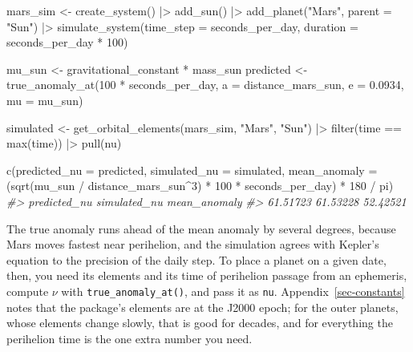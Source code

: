 \documentclass[
  10.5pt,
  letterpaper,
]{scrbook}
\newenvironment{Shaded}{\begin{snugshade}}{\end{snugshade}}
\newcommand{\AttributeTok}[1]{\textcolor[rgb]{0.00,0.00,0.00}{#1}}
\newcommand{\CommentTok}[1]{\textcolor[rgb]{0.00,0.00,0.00}{\textit{#1}}}
\newcommand{\DecValTok}[1]{\textcolor[rgb]{0.00,0.00,0.00}{#1}}
\newcommand{\FloatTok}[1]{\textcolor[rgb]{0.00,0.00,0.00}{#1}}
\newcommand{\FunctionTok}[1]{\textcolor[rgb]{0.00,0.00,0.00}{#1}}
\newcommand{\NormalTok}[1]{\textcolor[rgb]{0.00,0.00,0.00}{#1}}
\newcommand{\OtherTok}[1]{\textcolor[rgb]{0.00,0.00,0.00}{#1}}
\newcommand{\SpecialCharTok}[1]{\textcolor[rgb]{0.00,0.00,0.00}{#1}}
\newcommand{\StringTok}[1]{\textcolor[rgb]{0.00,0.00,0.00}{#1}}
\theoremstyle{definition}
\theoremstyle{plain}
\theoremstyle{remark}
\begin{document}
\begin{Shaded}
\begin{Highlighting}[]
\NormalTok{mars\_sim }\OtherTok{\textless{}{-}} \FunctionTok{create\_system}\NormalTok{() }\SpecialCharTok{|\textgreater{}}
  \FunctionTok{add\_sun}\NormalTok{() }\SpecialCharTok{|\textgreater{}}
  \FunctionTok{add\_planet}\NormalTok{(}\StringTok{"Mars"}\NormalTok{, }\AttributeTok{parent =} \StringTok{"Sun"}\NormalTok{) }\SpecialCharTok{|\textgreater{}}
  \FunctionTok{simulate\_system}\NormalTok{(}\AttributeTok{time\_step =}\NormalTok{ seconds\_per\_day, }\AttributeTok{duration =}\NormalTok{ seconds\_per\_day }\SpecialCharTok{*} \DecValTok{100}\NormalTok{)}

\NormalTok{mu\_sun }\OtherTok{\textless{}{-}}\NormalTok{ gravitational\_constant }\SpecialCharTok{*}\NormalTok{ mass\_sun}
\NormalTok{predicted }\OtherTok{\textless{}{-}} \FunctionTok{true\_anomaly\_at}\NormalTok{(}\DecValTok{100} \SpecialCharTok{*}\NormalTok{ seconds\_per\_day,}
                             \AttributeTok{a =}\NormalTok{ distance\_mars\_sun, }\AttributeTok{e =} \FloatTok{0.0934}\NormalTok{, }\AttributeTok{mu =}\NormalTok{ mu\_sun)}

\NormalTok{simulated }\OtherTok{\textless{}{-}} \FunctionTok{get\_orbital\_elements}\NormalTok{(mars\_sim, }\StringTok{"Mars"}\NormalTok{, }\StringTok{"Sun"}\NormalTok{) }\SpecialCharTok{|\textgreater{}}
  \FunctionTok{filter}\NormalTok{(time }\SpecialCharTok{==} \FunctionTok{max}\NormalTok{(time)) }\SpecialCharTok{|\textgreater{}}
  \FunctionTok{pull}\NormalTok{(nu)}

\FunctionTok{c}\NormalTok{(}\AttributeTok{predicted\_nu =}\NormalTok{ predicted, }\AttributeTok{simulated\_nu =}\NormalTok{ simulated,}
  \AttributeTok{mean\_anomaly =}\NormalTok{ (}\FunctionTok{sqrt}\NormalTok{(mu\_sun }\SpecialCharTok{/}\NormalTok{ distance\_mars\_sun}\SpecialCharTok{\^{}}\DecValTok{3}\NormalTok{) }\SpecialCharTok{*} \DecValTok{100} \SpecialCharTok{*}
\NormalTok{                    seconds\_per\_day) }\SpecialCharTok{*} \DecValTok{180} \SpecialCharTok{/}\NormalTok{ pi)}
\CommentTok{\#\textgreater{} predicted\_nu simulated\_nu mean\_anomaly }
\CommentTok{\#\textgreater{}     61.51723     61.53228     52.42521}
\end{Highlighting}
\end{Shaded}

The true anomaly runs ahead of the mean anomaly by several degrees,
because Mars moves fastest near perihelion, and the simulation agrees
with Kepler's equation to the precision of the daily step. To place a
planet on a given date, then, you need its elements and its time of
perihelion passage from an ephemeris, compute \(\nu\) with
\texttt{true\_anomaly\_at()}, and pass it as \texttt{nu}.
Appendix~\ref{sec-constants} notes that the package's elements are at
the J2000 epoch; for the outer planets, whose elements change slowly,
that is good for decades, and for everything the perihelion time is the
one extra number you need.
\end{document}
